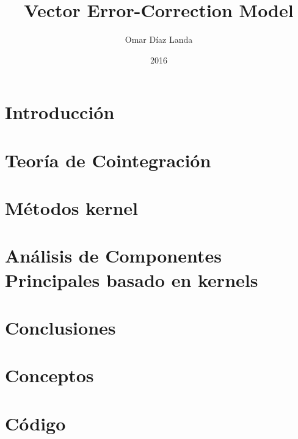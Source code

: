 \documentclass[12pt,oneside]{extbook}
\title{Vector Error-Correction Model}
\author{Omar Díaz Landa}
\date{2016}
\theoremstyle{plain}
\theoremstyle{definition}
\theoremstyle{remark}
\begin{document}
\frontmatter


 

\tableofcontents

\mainmatter
\chapter{Introducción}
%

\chapter{Teoría de Cointegración}


\chapter{Métodos kernel}
%

\chapter{Análisis de Componentes Principales basado en kernels}
%

%

\chapter{Conclusiones}
%

\appendix
\chapter{Conceptos}
%
\chapter{Código}
%

\clearpage
{}
\nocite{*}
	
\end{document}
